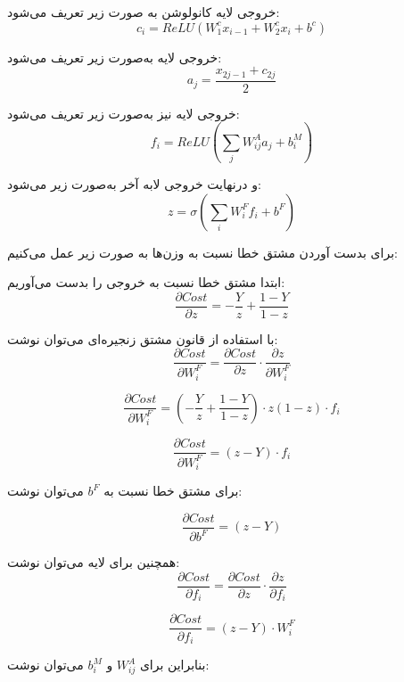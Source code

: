 \begin{qsolve}
	خروجی لایه کانولوشن به صورت زیر تعریف می‌شود:
	$$ c_i=ReLU(W_1^c x_{i-1} + W_2^c x_i + b^c) $$
	
	خروجی لایه  به‌صورت زیر تعریف می‌شود:
	$$ a_j=\frac{x_{2j-1}+c_{2j}}{2} $$
	
	خروجی لایه  نیز به‌صورت زیر تعریف می‌شود:
	$$ f_i=ReLU(\sum_{j} W_{ij}^A a_j + b_i^M) $$
	
	و درنهایت خروجی لابه آخر  به‌صورت زیر می‌شود:
	$$ z=\sigma(\sum_{i} W_i^F f_i + b^F) $$
	
	برای بدست آوردن مشتق‌ خطا نسبت به وزن‌ها به صورت زیر عمل می‌کنیم:
	
	ابتدا مشتق خطا نسبت به خروجی را بدست می‌آوریم:
	$$ \frac{\partial Cost}{\partial z}=-\frac{Y}{z}+\frac{1-Y}{1-z} $$
	
	با استفاده از قانون مشتق زنجیره‌ای می‌توان نوشت:
	$$ \frac{\partial Cost}{\partial W_i^F}=\frac{\partial Cost}{\partial z} \cdot \frac{\partial z}{\partial W_i^F} $$
	
	$$ \frac{\partial Cost}{\partial W_i^F}=(-\frac{Y}{z}+\frac{1-Y}{1-z})\cdot z(1-z) \cdot f_i $$
	
	$$ \frac{\partial Cost}{\partial W_i^F}=(z-Y)\cdot f_i $$
	
	برای مشتق خطا نسبت به $b^F$ می‌توان نوشت:
	
	$$ \frac{\partial Cost}{\partial b^F}=(z-Y) $$
	
	همچنین برای لایه  می‌توان نوشت:
	$$ \frac{\partial Cost}{\partial f_i}=\frac{\partial Cost}{\partial z} \cdot \frac{\partial z}{\partial f_i} $$
	
	$$ \frac{\partial Cost}{\partial f_i}=(z-Y)\cdot W_i^F $$
	
	بنابراین برای $W_{ij}^A$ و $b_i^M$ می‌توان نوشت:
	
\end{qsolve}



